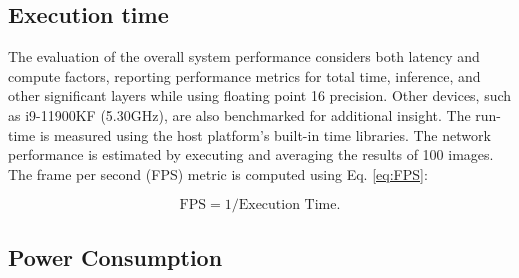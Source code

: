 


\subsection{Execution time}
The evaluation of the overall system performance considers both latency and compute factors, reporting performance metrics for total time, inference, and other significant layers while using floating point 16 precision. Other devices, such as i9-11900KF (5.30GHz), are also benchmarked for additional insight. The run-time is measured using the host platform's built-in time libraries. The network performance is estimated by executing and averaging the results of 100 images. The frame per second (FPS) metric is computed using Eq. \ref{eq:FPS}: 

\begin{equation}\label{eq:FPS}
\text{FPS}= 1/\text{Execution Time}.
\end{equation}

\subsection{Power Consumption}

